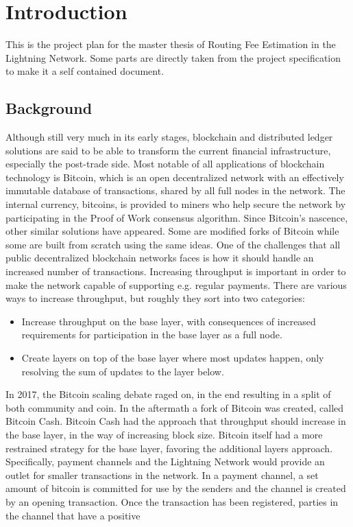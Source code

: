 \documentclass[10pt, titlepage, oneside, a4paper]{article}
\begin{document}
\section{Introduction}

This is the project plan for the master thesis of Routing Fee Estimation in the Lightning Network. Some parts are directly taken from the project specification to make it a self contained document.

\subsection{Background}

Although still very much in its early stages, blockchain and distributed ledger
solutions are said to be able to transform the current financial infrastructure,
especially the post-trade side. Most notable of all applications of blockchain
technology is Bitcoin, which is an open decentralized network with an effectively
immutable database of transactions, shared by all full nodes in the network. The
internal currency, bitcoins, is provided to miners who help secure the network by
participating in the Proof of Work consensus algorithm. Since Bitcoin’s nascence,
other similar solutions have appeared. Some are modified forks of Bitcoin while
some are built from scratch using the same ideas.
One of the challenges that all public decentralized blockchain networks faces is
how it should handle an increased number of transactions. Increasing throughput
is important in order to make the network capable of supporting e.g. regular
payments. There are various ways to increase throughput, but roughly they sort
into two categories:
\begin{itemize}
	\item Increase throughput on the base layer, with consequences of increased requirements for participation in the base layer as a full node.
	\item  Create layers on top of the base layer where most updates happen, only
	resolving the sum of updates to the layer below.
\end{itemize}

In 2017, the Bitcoin scaling debate raged on, in the end resulting in a split of
both community and coin. In the aftermath a fork of Bitcoin was created, called
Bitcoin Cash. Bitcoin Cash had the approach that throughput should increase in
the base layer, in the way of increasing block size. Bitcoin itself had a more
restrained strategy for the base layer, favoring the additional layers approach.
Specifically, payment channels and the Lightning Network would provide an
outlet for smaller transactions in the network.
In a payment channel, a set amount of bitcoin is committed for use by the
senders and the channel is created by an opening transaction. Once the
transaction has been registered, parties in the channel that have a positive
\end{document}
